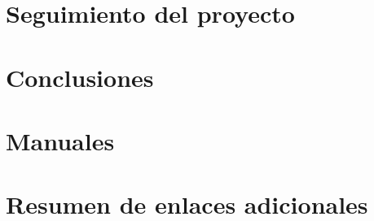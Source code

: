 \documentclass[openright,twoside,10pt]{book}
\begin{document}
\chapter{Seguimiento del proyecto}\label{cap:seguimiento}


\chapter{Conclusiones}


\appendix

\chapter{Manuales}\label{aped.A}


\chapter{Resumen de enlaces adicionales}\label{aped.B}






\cleardoublepage
{}

 


\end{document}
